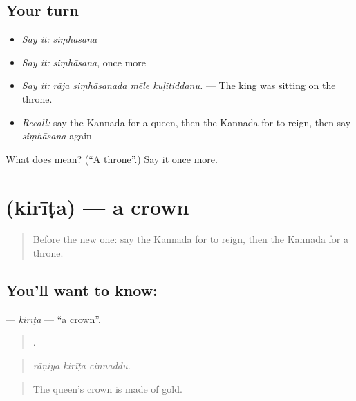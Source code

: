 \subsection*{Your turn}
\begin{itemize}
\raggedright
  \item \emph{Say it:} \emph{siṃhāsana}
  \item \emph{Say it:} \emph{siṃhāsana}, once more
  \item \emph{Say it:} \emph{rāja siṃhāsanada mēle kuḷitiddanu.} — The king was sitting on the throne.
  \item \emph{Recall:} say the Kannada for a queen, then the Kannada for to reign, then say \emph{siṃhāsana} again
\end{itemize}

\begin{tcolorbox}[breakable,colback=teal!4,colframe=teal!35!black,title={Before you move on}]
What does  mean? (\textquotedblleft{}A throne\textquotedblright{}.) Say it once more.
\end{tcolorbox}
\section[\texorpdfstring{\kn{ಕಿರೀಟ} (kirīṭa)}{ಕಿರೀಟ (kirīṭa)}]{ (kirīṭa) — a crown}

\label{lesson:KA-C322-kirita}



\begin{quote}
Before the new one: say the Kannada for to reign, then the Kannada for a throne.
\end{quote}

\subsection*{You'll want to know: }
\textbf{} — \emph{kirīṭa} — \textquotedblleft{}a crown\textquotedblright{}.

\begin{quote}
  .
\end{quote}

\begin{quote}
\emph{rāṇiya kirīṭa cinnaddu.}
\end{quote}

\begin{quote}
The queen's crown is made of gold.
\end{quote}

